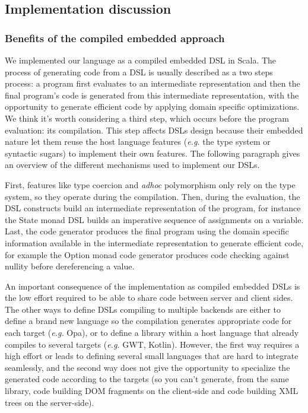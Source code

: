 \documentclass[american,english,runningheads]{llncs}
\newcommand{\eg}{\emph{e.g.}}
\begin{document}
\subsection{Implementation discussion}

\subsubsection{Benefits of the compiled embedded approach}

We implemented our language as a compiled embedded DSL in Scala. The process of generating code from a DSL is usually
described as a two steps process: a program first evaluates to an intermediate representation and then the final
program’s code is generated from this intermediate representation, with the opportunity to generate efficient code
by applying domain specific optimizations. We think it’s worth considering a third step, which occurs before the
program evaluation: its compilation. This step affects DSLs design because their embedded nature let them reuse the
host language features (\eg{} the type system or syntactic sugars) to implement their own features. The following
paragraph gives an overview of the different mechanisms used to implement our DSLs.

First, features like type coercion and \emph{adhoc} polymorphism only rely on the type system, so they operate during
the compilation. Then, during the evaluation, the DSL constructs build an intermediate representation of the program,
for instance the State monad DSL builds an imperative sequence of assignments on a variable. Last, the code generator
produces the final program using the domain specific information available in the intermediate representation to
generate efficient code, for example the Option monad code generator produces code checking against nullity before
dereferencing a value.

An important consequence of the implementation as compiled embedded DSLs is the low effort required to be able to
share code between server and client sides. The other ways to define DSLs compiling to multiple backends are either
to define a brand new language so the compilation generates appropriate code for each target (\eg{} Opa), or to
define a library within a host language that already compiles to several targets (\eg{} GWT, Kotlin). However, the
first way requires a high effort or leads to defining several small languages that are hard to integrate seamlessly,
and the second way does not give the opportunity to specialize the generated code according to the targets (so you
can’t generate, from the same library, code building DOM fragments on the client-side and code building XML trees on
the server-side).
\end{document}
